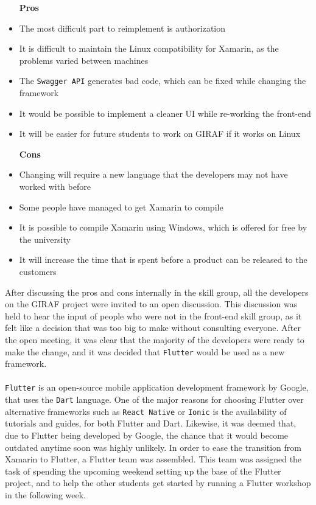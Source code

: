 \begin{itemize}
    \item [\textbf{Pros}]
    \item The most difficult part to reimplement is authorization
    \item It is difficult to maintain the Linux compatibility for Xamarin, as the problems varied between machines
    \item The \texttt{Swagger API} generates bad code, which can be fixed while changing the framework
    \item It would be possible to implement a cleaner UI while re-working the front-end
    \item It will be easier for future students to work on GIRAF if it works on Linux
    \item [\textbf{Cons}]
    \item Changing will require a new language that the developers may not have worked with before
    \item Some people have managed to get Xamarin to compile
    \item It is possible to compile Xamarin using Windows, which is offered for free by the university
    \item It will increase the time that is spent before a product can be released to the customers
\end{itemize}
\noindent
After discussing the pros and cons internally in the skill group, all the developers on the GIRAF project were invited to an open discussion. 
This discussion was held to hear the input of people who were not in the front-end skill group, as it felt like a decision that was too big to make without consulting everyone.
After the open meeting, it was clear that the majority of the developers were ready to make the change, and it was decided that \texttt{Flutter} would be used as a new framework. 
\\\\
\texttt{Flutter} is an open-source mobile application development framework by Google, that uses the \texttt{Dart} language.
One of the major reasons for choosing Flutter over alternative frameworks such as \texttt{React Native} or \texttt{Ionic} is the availability of tutorials and guides, for both Flutter and Dart. 
Likewise, it was deemed that, due to Flutter being developed by Google, the chance that it would become outdated anytime soon was highly unlikely.
In order to ease the transition from Xamarin to Flutter, a Flutter team was assembled.
This team was assigned the task of spending the upcoming weekend setting up the base of the Flutter project, and to help the other students get started by running a Flutter workshop in the following week.

